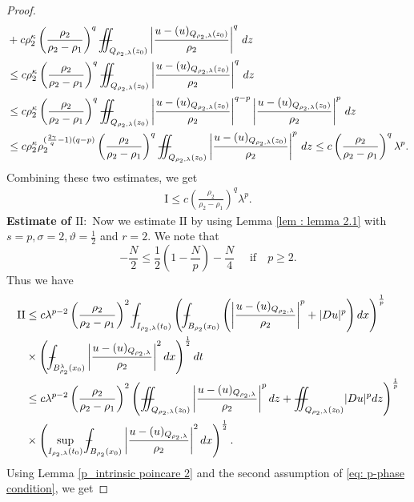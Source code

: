 \documentclass[notitlepage,11pt,reqno]{amsart}
\theoremstyle{definition}
\numberwithin{equation}{section}
\newcommand{\la}{\lambda}
\newcommand{\iintss}{{\int\hspace{-0.28cm}\int}}
\newcommand{ \miints }{{\iintss\hspace{-0.56cm} -\hspace{-0.15cm}-}}
\newcommand{\miint}[1]{{\miints_{\hspace{-0.13cm}#1}}}
\def\Xint#1{\mathchoice
	{\XXint\displaystyle\textstyle{#1}}%
	{\XXint\textstyle\scriptstyle{#1}}%
	{\XXint\scriptstyle\scriptscriptstyle{#1}}%
	{\XXint\scriptscriptstyle\scriptscriptstyle{#1}}%
	\!\int}
\def\XXint#1#2#3{{\setbox0=\hbox{$#1{#2#3}{\int}$}
		\vcenter{\hbox{$#2#3$}}\kern-.50\wd0}}
\def\Xint#1{\mathchoice
	{\XXint\displaystyle\textstyle{#1}}%
	{\XXint\textstyle\scriptstyle{#1}}%
	{\XXint\scriptstyle\scriptscriptstyle{#1}}%
	{\XXint\scriptscriptstyle\scriptscriptstyle{#1}}%
	\!\int}
\def\XXint#1#2#3{{\setbox0=\hbox{$#1{#2#3}{\int}$}
		\vcenter{\hbox{$#2#3$}}\kern-.50\wd0}}
\def\dashint{\Xint-}
\begin{document}
\begin{proof}
\begin{align*}
&+c \rho_2^{\kappa} \left(\frac{\rho_2}{\rho_2-\rho_1}\right)^q \miint{Q_{\rho_2, \lambda}(z_0)}\left|\frac{u-(u)_{Q_{\rho_2, \lambda}(z_0)}}{\rho_2}\right|^q\, dz\\
&\leq c \rho_2^{\kappa}\left(\frac{\rho_2}{\rho_2-\rho_1}\right)^q \miint{Q_{\rho_2, \lambda}(z_0)}\left|\frac{u-(u)_{Q_{\rho_2, \lambda}(z_0)}}{\rho_2}\right|^q\, dz\\
&\leq c \rho^{\kappa}_2\left(\frac{\rho_2}{\rho_2-\rho_1}\right)^q \miint{Q_{\rho_2, \lambda}(z_0)}\left|\frac{u-(u)_{Q_{\rho_2, \lambda}(z_0)}}{\rho_2}\right|^{q-p}\left|\frac{u-(u)_{Q_{\rho_2, \lambda}(z_0)}}{\rho_2}\right|^p\, dz\\
&\leq c \rho^{\kappa}_2 \rho^{(\frac{2\gamma}{q}-1)(q-p)}_2\left(\frac{\rho_2}{\rho_2-\rho_1}\right)^q\miint{Q_{\rho_2, \lambda}(z_0)}\left|\frac{u-(u)_{Q_{\rho_2, \lambda}(z_0)}}{\rho_2}\right|^p\, dz\leq c \left(\frac{\rho_2}{\rho_2-\rho_1}\right)^q \lambda^p.
\end{align*}
Combining these two estimates, we get
\begin{align*}
    \mathrm{I}\leq c \left(\frac{\rho_2}{\rho_2-\rho_1}\right)^q \lambda^p.
\end{align*}
\textbf{Estimate of $\mathrm{II}:$} Now we estimate $\mathrm{II}$ by using Lemma \ref{lem : lemma 2.1} with $s=p, \sigma=2, \vartheta=\frac{1}{2}$ and $r=2.$ We note that
\[-\frac{N}{2}\leq \frac{1}{2}\left(1-\frac{N}{p}\right)-\frac{N}{4}\quad \text{ if}\quad p\geq 2.\] Thus we have
\begin{align*}
\mathrm{II} &\leq c\la^{p-2}\left(\frac{\rho_2}{\rho_2-\rho_1}\right)^2\dashint_{I_{\rho_2, \lambda}(t_0)}\left(\dashint_{B_{\rho_2}(x_0)}\left(\left|\frac{u-(u)_{Q_{\rho_2, \lambda}}}{\rho_2}\right|^p+|D u|^p\right) dx\right)^{\frac{1}{p}} \\
&\times\left(\dashint_{B^{\la}_{\rho_2}(x_0)}\left|\frac{u-(u)_{Q_{\rho_2, \lambda}}}{\rho_2}\right|^2 dx\right)^{\frac{1}{2}}dt\\
&\leq c\la^{p-2}\left(\frac{\rho_2}{\rho_2-\rho_1}\right)^2\left(\miint{Q_{\rho_2, \lambda}(z_0)}\left|\frac{u-(u)_{Q_{\rho_2, \lambda}}}{\rho_2}\right|^p dz+ \miint{Q_{\rho_2, \lambda}(z_0)}|D u|^p dz\right)^{\frac{1}{p}}\\
&\times\left(\sup_{I_{\rho_2, \lambda}(t_0)}\dashint_{B_{\rho_2}(x_0)}\left|\frac{u-(u)_{Q_{\rho_2, \lambda}}}{\rho_2}\right|^2 dx\right)^{\frac{1}{2}}.
\end{align*}
Using Lemma \ref{p_intrinsic poincare 2} and the second assumption of \eqref{eq: p-phase condition}, we get

\end{proof}
\end{document}
